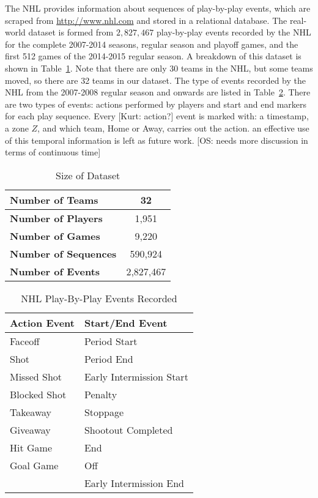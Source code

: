 \documentclass[]{article}
\begin{document}
The NHL provides information about sequences of play-by-play events, which are scraped from \url{http://www.nhl.com} and stored in a relational database. The real-world dataset is formed from $2,827,467$ play-by-play events recorded by the NHL for the complete 2007-2014 seasons, regular season and playoff games, and the first 512 games of the 2014-2015 regular season. A breakdown of this dataset is shown in Table~\ref{table:size-of-dataset}. Note that there are only 30 teams in the NHL, but some teams moved, so there are 32 teams in our dataset. 
The type of events recorded by the NHL from the 2007-2008 regular season and onwards are listed in Table~\ref{table:events-recorded}. There are two types of events: actions performed by players and start and end markers for each play sequence. Every [Kurt: action?] event is marked with: a timestamp, a zone $Z$, and which team, Home or Away, carries out the action. 
 an effective use of this temporal information is left as future work. [OS: needs more discussion in terms of continuous time]
\begin{table}[htb]
\caption{Size of Dataset}
\label{table:size-of-dataset}
\begin{center}
\begin{tabular}{|l|c|}
\hline
\bf{Number of Teams} & 32 \\ \hline
\bf{Number of Players} & 1,951 \\ \hline
\bf{Number of Games} & 9,220 \\ \hline
\bf{Number of Sequences} & 590,924 \\ \hline
\bf{Number of Events} & 2,827,467 \\ \hline
\end{tabular}
\end{center}
\end{table}

\begin{table}[htb]
\caption{NHL Play-By-Play Events Recorded}
\label{table:events-recorded}
\begin{center}
\begin{tabular}{|l|l|}
\hline
 \bf{Action Event} & \bf{Start/End Event}\\ \hline
Faceoff & Period Start \\\hline
Shot & Period End \\\hline
Missed Shot & Early Intermission Start\\ \hline
Blocked Shot & Penalty\\ \hline
Takeaway & Stoppage\\  \hline
Giveaway & Shootout Completed\\ \hline
Hit Game & End\\ \hline
Goal Game & Off\\ \hline 
& Early Intermission End \\
\hline
\end{tabular}
\end{center}
\end{table}
\end{document}
